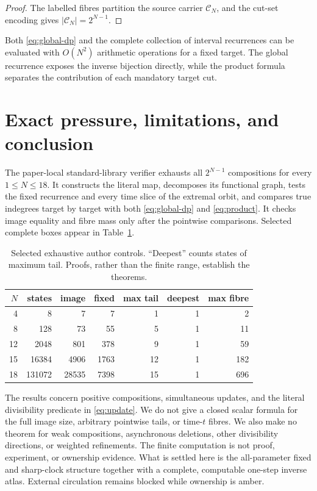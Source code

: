 \documentclass[a4paper,10pt]{amsart}
\theoremstyle{remark}
\newcommand{\Comp}{\mathcal C}
\begin{document}
\begin{proof}
The labelled fibres partition the source carrier $\Comp_N$, and the cut-set
encoding gives $|\Comp_N|=2^{N-1}$.
\end{proof}

Both \eqref{eq:global-dp} and the complete collection of interval recurrences
can be evaluated with $O(N^2)$ arithmetic operations for a fixed target.
The global recurrence exposes the inverse bijection directly, while the
product formula separates the contribution of each mandatory target cut.

\section{Exact pressure, limitations, and conclusion}

The paper-local standard-library verifier exhausts all $2^{N-1}$ compositions
for every $1\leq N\leq18$.  It constructs the literal map, decomposes its
functional graph, tests the fixed recurrence and every time slice of the
extremal orbit, and compares true indegrees target by target with both
\eqref{eq:global-dp} and \eqref{eq:product}.  It checks image equality and
fibre mass only after the pointwise comparisons.  Selected complete boxes
appear in Table~\ref{tab:control}.

\begin{table}[h]
\centering
\small
\begin{tabular}{rrrrrrr}
\hline
$N$&states&image&fixed&max tail&deepest&max fibre\\
\hline
4&8&7&7&1&1&2\\
8&128&73&55&5&1&11\\
12&2048&801&378&9&1&59\\
15&16384&4906&1763&12&1&182\\
18&131072&28535&7398&15&1&696\\
\hline
\end{tabular}
\caption{Selected exhaustive author controls.  ``Deepest'' counts states of
maximum tail.  Proofs, rather than the finite range, establish the theorems.}
\label{tab:control}
\end{table}

The results concern positive compositions, simultaneous updates, and the
literal divisibility predicate in \eqref{eq:update}.  We do not give a closed
scalar formula for the full image size, arbitrary pointwise tails, or
time-$t$ fibres.  We also make no theorem for weak compositions, asynchronous
deletions, other divisibility directions, or weighted refinements.  The
finite computation is not proof, experiment, or ownership evidence.  What is
settled here is the all-parameter fixed and sharp-clock structure together
with a complete, computable one-step inverse atlas.  External circulation
remains blocked while ownership is amber.
\end{document}
